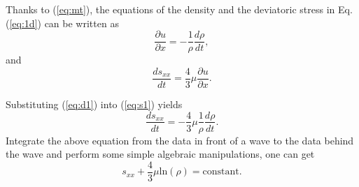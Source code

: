 \documentclass[review]{elsarticle}
\numberwithin{equation}{section}
\numberwithin{table}{section}
\begin{document}
Thanks to (\ref{eq:mt}), the equations of the density and the deviatoric stress in Eq.(\ref{eq:1d}) can be written as
  \begin{equation}\label{eq:d1}
    \frac{\partial u}{\partial x} = -\frac{1}{\rho}\frac{d\rho}{dt},
  \end{equation}
  and
  \begin{equation}\label{eq:s1}
    \frac{ds_{xx}}{dt}=\frac{4}{3}\mu\frac{\partial u}{\partial x}.
  \end{equation}

  Substituting (\ref{eq:d1}) into (\ref{eq:s1}) yields
  \begin{equation}
    \frac{ds_{xx}}{dt}=-\frac{4}{3}\mu \frac{1}{\rho}\frac{d\rho}{dt}.
\end{equation}
Integrate the above equation from the data in front of a wave to the data behind the wave and perform some simple algebraic manipulations, one can get
\begin{equation}\label{eq:rhosxx}
  s_{xx}+\frac{4}{3}\mu\text{ln}(\rho) = \text{constant}.
\end{equation}
\end{document}
